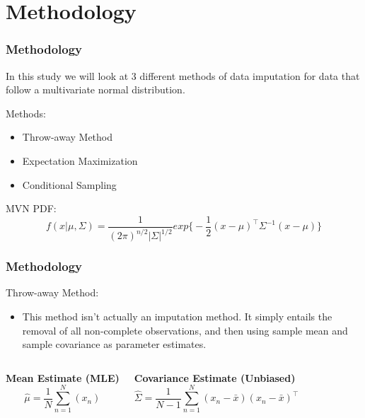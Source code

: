 \documentclass{beamer}
\begin{document}
\section{Methodology}

\begin{frame}
\frametitle{Methodology}
In this study we will look at 3 different methods of data imputation for data that follow a multivariate normal distribution.

Methods:
\begin{itemize}
\item Throw-away Method
\item Expectation Maximization
\item Conditional Sampling
\end{itemize}

\medskip
MVN PDF:
\begin{equation*}
f(x|\mu,\Sigma) = \frac{1}{(2\pi)^{n/2} \lvert \Sigma \rvert^{1/2}}exp{ \bigl\{-\frac{1}{2}(x-\mu)^\top \Sigma^{-1}(x-\mu) \bigr\} }
\end{equation*}
\end{frame}

\begin{frame}
\frametitle{Methodology}
Throw-away Method:
\begin{itemize}
\item This method isn't actually an imputation method. It simply entails the removal of all non-complete observations, and then using sample mean and sample covariance as parameter estimates.
\end{itemize}

\medskip
\begin{columns}[c] %

\textbf{Mean Estimate (MLE)}
\begin{equation*}
\hat{\mu} = \frac{1}{N} \sum_{n=1}^N(x_n)
\end{equation*}

\textbf{ Covariance Estimate (Unbiased) }
\begin{equation*}
\hat{\Sigma} = \frac{1}{N-1} \sum_{n=1}^N(x_n - \bar{x})(x_n - \bar{x})^\top
\end{equation*}

\end{columns}

\end{frame}
\end{document}

